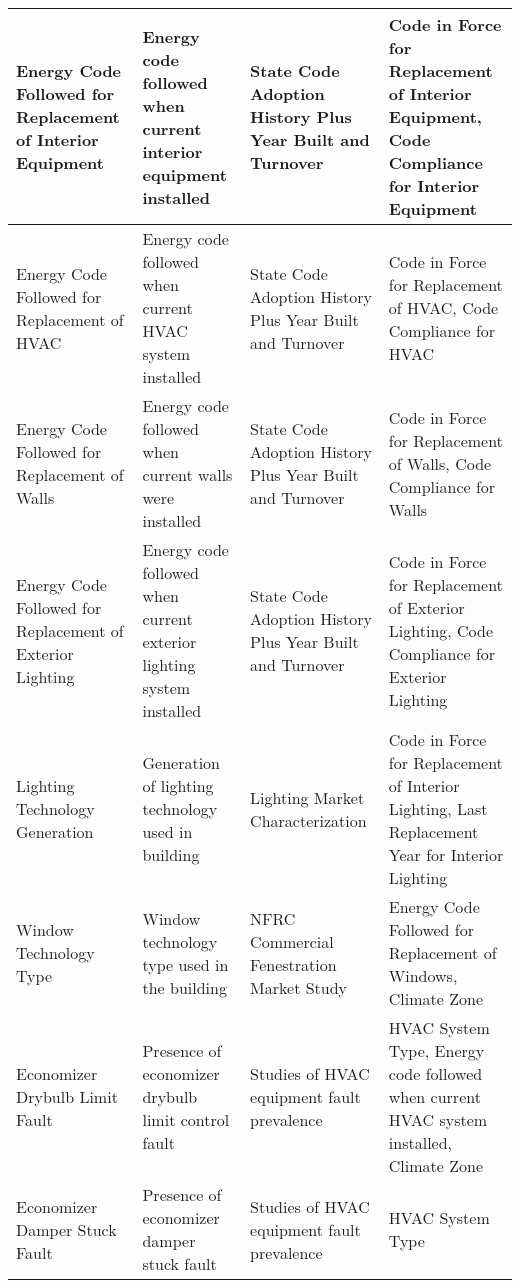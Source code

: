 \begin{center}
\begin{longtable}{|p{1.3in}|p{1.5in}|p{1.5in}|p{1.5in}|}
Energy Code Followed for Replacement of Interior Equipment      & Energy code followed when current interior equipment installed                 & State Code Adoption History Plus Year Built and Turnover    & Code in Force for Replacement of Interior Equipment, Code Compliance for Interior Equipment          \\ \hline
Energy Code Followed for Replacement of HVAC                    & Energy code followed when current HVAC system installed                        & State Code Adoption History Plus Year Built and Turnover    & Code in Force for Replacement of HVAC, Code Compliance for HVAC                                      \\ \hline
Energy Code Followed for Replacement of Walls                   & Energy code followed when current walls were installed                         & State Code Adoption History Plus Year Built and Turnover    & Code in Force for Replacement of Walls, Code Compliance for Walls                                    \\ \hline
Energy Code Followed for Replacement of Exterior Lighting       & Energy code followed when current exterior lighting system installed           & State Code Adoption History Plus Year Built and Turnover    & Code in Force for Replacement of Exterior Lighting, Code Compliance for Exterior Lighting            \\ \hline
Lighting Technology Generation                                  & Generation of lighting technology used in building                             & Lighting Market Characterization                            & Code in Force for Replacement of Interior Lighting, Last Replacement Year for Interior Lighting      \\ \hline
Window Technology Type                                          & Window technology type used in the building                                    & NFRC Commercial Fenestration Market Study                   & Energy Code Followed for Replacement of Windows, Climate Zone                                        \\ \hline
Economizer Drybulb Limit Fault                                  & Presence of economizer drybulb limit control fault                             & Studies of HVAC equipment fault prevalence                  & HVAC System Type, Energy code followed when current HVAC system installed, Climate Zone              \\ \hline
Economizer Damper Stuck Fault                                   & Presence of economizer damper stuck fault                                      & Studies of HVAC equipment fault prevalence                  & HVAC System Type                                                                                     \\ \hline

\end{longtable}
\end{center}
